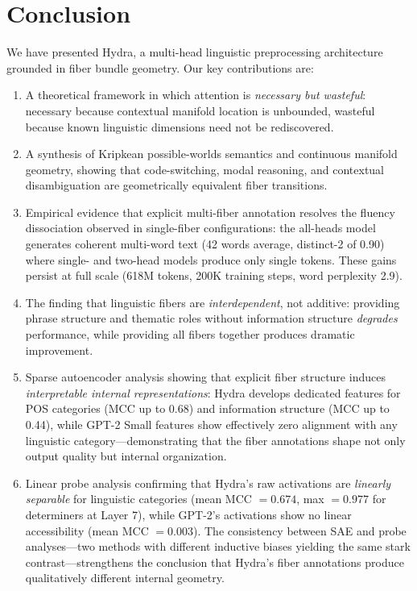 \documentclass[11pt]{article}
\begin{document}
\section{Conclusion}
\label{sec:conclusion}

We have presented Hydra, a multi-head linguistic preprocessing architecture 
grounded in fiber bundle geometry. Our key contributions are:

\begin{enumerate}
    \item A theoretical framework in which attention is \emph{necessary but 
    wasteful}: necessary because contextual manifold location is unbounded, 
    wasteful because known linguistic dimensions need not be rediscovered.
    
    \item A synthesis of Kripkean possible-worlds semantics and continuous 
    manifold geometry, showing that code-switching, modal reasoning, and 
    contextual disambiguation are geometrically equivalent fiber transitions.
    
    \item Empirical evidence that explicit multi-fiber annotation resolves 
    the fluency dissociation observed in single-fiber configurations: the 
    all-heads model generates coherent multi-word text (42 words average, 
    distinct-2 of 0.90) where single- and two-head models produce only 
    single tokens. These gains persist at full scale (618M tokens, 200K 
    training steps, word perplexity 2.9).
    
    \item The finding that linguistic fibers are \emph{interdependent}, not 
    additive: providing phrase structure and thematic roles without 
    information structure \emph{degrades} performance, while providing all 
    fibers together produces dramatic improvement.
    
    \item Sparse autoencoder analysis showing that explicit fiber structure 
    induces \emph{interpretable internal representations}: Hydra develops 
    dedicated features for POS categories (MCC up to 0.68) and information 
    structure (MCC up to 0.44), while GPT-2 Small features show effectively 
    zero alignment with any linguistic category---demonstrating that the 
    fiber annotations shape not only output quality but internal organization.
    
    \item Linear probe analysis confirming that Hydra's raw activations are 
    \emph{linearly separable} for linguistic categories (mean MCC $= 0.674$, 
    max $= 0.977$ for determiners at Layer 7), while GPT-2's activations 
    show no linear accessibility (mean MCC $= 0.003$). The consistency 
    between SAE and probe analyses---two methods with different inductive 
    biases yielding the same stark contrast---strengthens the conclusion 
    that Hydra's fiber annotations produce qualitatively different 
    internal geometry.
\end{enumerate}
\end{document}
